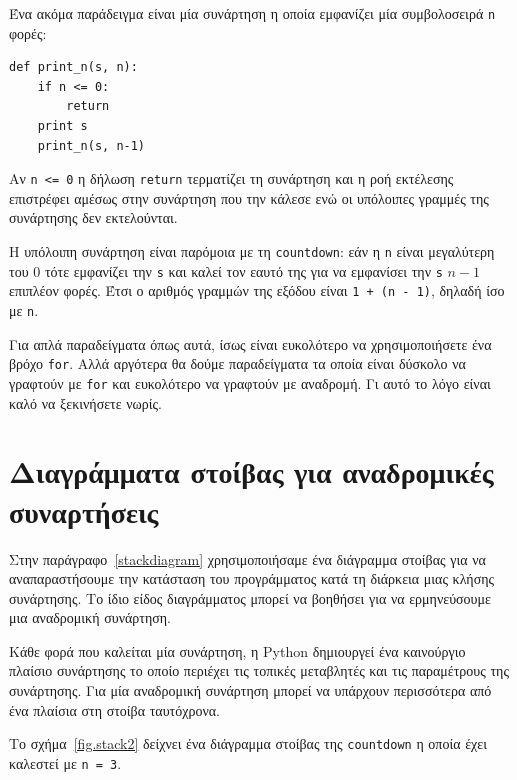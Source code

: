 \documentclass[10pt]{book}
\begin{document}
Ένα ακόμα παράδειγμα είναι μία συνάρτηση η οποία εμφανίζει μία συμβολοσειρά 
{\tt n} φορές:


\begin{verbatim}
def print_n(s, n):
    if n <= 0:
        return
    print s
    print_n(s, n-1)
\end{verbatim}
%

Αν {\tt n <= 0} η δήλωση {\tt return} τερματίζει τη συνάρτηση και η ροή εκτέλεσης επιστρέφει αμέσως στην συνάρτηση που την κάλεσε ενώ οι υπόλοιπες γραμμές της συνάρτησης δεν εκτελούνται.

Η υπόλοιπη συνάρτηση είναι παρόμοια με τη {\tt countdown}: 
εάν η {\tt n} είναι μεγαλύτερη του 0 τότε εμφανίζει την {\tt s} και καλεί τον
εαυτό της για να εμφανίσει την {\tt s} $n-1$ επιπλέον φορές. Έτσι ο αριθμός γραμμών της εξόδου είναι {\tt 1 + (n - 1)}, δηλαδή ίσο με {\tt n}.

Για απλά παραδείγματα όπως αυτά, ίσως είναι ευκολότερο να χρησιμοποιήσετε ένα βρόχο {\tt for}. Αλλά αργότερα θα δούμε παραδείγματα τα οποία είναι δύσκολο να γραφτούν με {\tt for} και ευκολότερο να γραφτούν με αναδρομή. Γι αυτό το λόγο είναι καλό να ξεκινήσετε νωρίς.



\section{Διαγράμματα στοίβας για αναδρομικές συναρτήσεις}
\label{recursive.stack}

Στην παράγραφο~\ref{stackdiagram} χρησιμοποιήσαμε ένα διάγραμμα στοίβας για να
αναπαραστήσουμε την κατάσταση του προγράμματος κατά τη διάρκεια μιας κλήσης συνάρτησης. Το ίδιο είδος διαγράμματος μπορεί να βοηθήσει για να ερμηνεύσουμε μια αναδρομική συνάρτηση.

Κάθε φορά που καλείται μία συνάρτηση, η Python δημιουργεί ένα καινούργιο πλαίσιο συνάρτησης το οποίο περιέχει τις τοπικές μεταβλητές και τις παραμέτρους της συνάρτησης. Για μία αναδρομική συνάρτηση μπορεί να υπάρχουν περισσότερα από ένα πλαίσια στη στοίβα ταυτόχρονα.

Το σχήμα~\ref{fig.stack2} δείχνει ένα διάγραμμα στοίβας της {\tt countdown} η οποία έχει καλεστεί με {\tt n = 3}.
\end{document}
